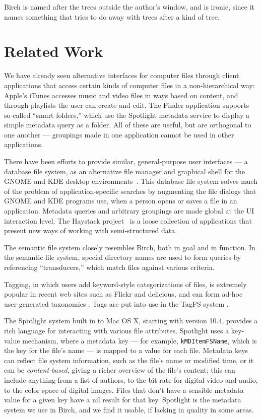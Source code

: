 \documentclass{article}
\begin{document}
Birch is named after the trees outside the author's window, and is
ironic, since it names something that tries to do away with trees
after a kind of tree.

\section{Related Work}

We have already seen alternative interfaces for computer files through
client applications that access certain kinds of computer files in a
non-hierarchical way: Apple's iTunes accesses music and video files in
ways based on content, and through playlists the user can create and
edit. The Finder application supports so-called ``smart folders,''
which use the Spotlight metadata service to display a simple
metadata query as a folder. All of these are useful, but are
orthogonal to one another --- groupings made in one application cannot
be used in other applications.

There have been efforts to provide similar, general-purpose user
interfaces --- a database file system, as an alternative file manager
and graphical shell for the GNOME and KDE desktop
environments~\cite{Gorter:2004}. This database file system solves much
of the problem of application-specific searches by augmenting the file
dialogs that GNOME and KDE programs use, when a person opens or saves
a file in an application. Metadata queries and arbitrary groupings are
made global at the UI interaction level. The Haystack
project~\cite{Karger:2003} is a loose collection of applications that
present new ways of working with semi-structured data.

The semantic file system \cite{Gifford:1991} closely resembles Birch,
both in goal and in function. In the semantic file system, special
directory names are used to form queries by referencing
``transducers,'' which match files against various criteria.

Tagging, in which users add keyword-style categorizations of files, is
extremely popular in recent web sites such as Flickr and delicious,
and can form ad-hoc user-generated taxonomies \cite{Mathes:2004}. Tags
are put into use in the TagFS system \cite{Bloehdorn:2006}.

The Spotlight system built in to Mac OS X, starting with version 10.4,
provides a rich language for interacting with various file
attributes. Spotlight uses a key-value mechanism, where a metadata key
--- for example, \texttt{kMDItemFSName}, which is the key for the
file's name --- is mapped to a value for each file. Metadata keys can
reflect file system information, such as the file's name or modified
time, or it can be \textit{content-based,} giving a richer overview of
the file's content; this can include anything from a list of authors,
to the bit rate for digital video and audio, to the color space of
digital images. Files that don't have a sensible metadata value for a
given key have a nil result for that key. Spotlight is the metadata
system we use in Birch, and we find it usable, if lacking in quality
in some areas.
\end{document}
